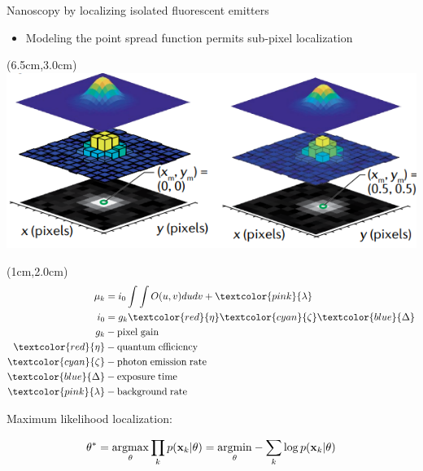 \documentclass{beamer}					%
\begin{document}



\begin{frame}{Nanoscopy by localizing isolated fluorescent emitters}
\begin{itemize}
\item Modeling the point spread function permits sub-pixel localization 
\end{itemize}
\begin{textblock*}{8cm}(6.5cm,3.0cm)
\includegraphics[width=\textwidth]{../../dissertation/dissertation/media/Model.png}
\end{textblock*}

\begin{textblock*}{2cm}(1cm,2.0cm)
\begin{align*}
\mu_{k} &= i_{0}\int\int O(u,v)dudv + \textcolor{pink}{\lambda}\\
i_{0} &= g_{k}\textcolor{red}{\eta} \textcolor{cyan}{\zeta}\textcolor{blue}{\Delta} 
\\
g_{k} &- \mathrm{pixel\; gain}\\
\textcolor{red}{\eta} &- \mathrm{quantum\; efficiency}\\
\textcolor{cyan}{\zeta} &- \mathrm{photon\; emission\; rate}\\
\textcolor{blue}{\Delta} &- \mathrm{exposure\; time}\\
\textcolor{pink}{\lambda} &- \mathrm{background \; rate}
\end{align*}
\end{textblock*}

\vspace{2in}

Maximum likelihood localization:

\begin{equation*}
\theta^{*} = \underset{\theta}{\mathrm{argmax}}\prod_{k}p(\bold{x}_{k}|\theta)= \underset{\theta}{\mathrm{argmin}}-\sum_{k}\log p(\bold{x}_{k}|\theta)
\end{equation*}

\end{frame}
\end{document}
